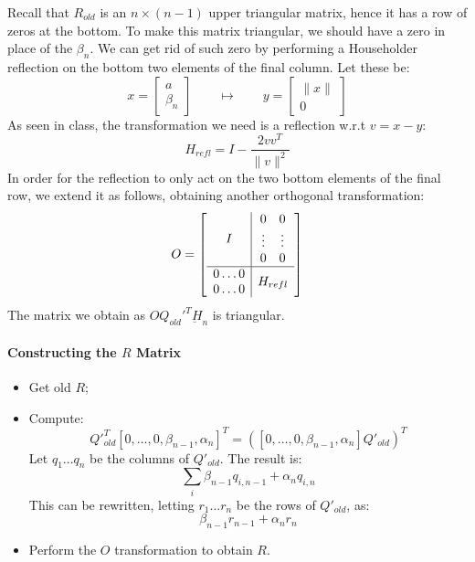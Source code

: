 \documentclass{article}
\begin{document}
Recall that $R_{old}$ is an $n \times (n-1)$ upper triangular matrix, hence it has a row of zeros at the bottom. To make this matrix triangular, we should have a zero in place of the $\beta_n$. We can get rid of such zero by performing a Householder reflection on the bottom two elements of the final column. Let these be:
\[x = \begin{bmatrix}
       a \\ \beta_n
      \end{bmatrix}
\quad\quad \mapsto \quad\quad y = \begin{bmatrix}
       \|x\| \\ 0
      \end{bmatrix}\] 
  As seen in class, the transformation we need is a reflection w.r.t $v = x - y$:
  \[H_{refl} = I - \dfrac{2 vv^T}{\|v\|^2}\]
  In order for the reflection to only act on the two bottom elements of the final row, we extend it as follows, obtaining another orthogonal transformation:
  \[O = \left[\begin{array}{ c | c }
    I & \begin{matrix}
         0&0\\
         \vdots &\vdots \\
         0&0
        \end{matrix}

 \\
    \hline
    \begin{matrix}
         0 \hdots 0\\0 \hdots 0
        \end{matrix} & H_{refl}
  \end{array}\right]\]
  The matrix we obtain as $OQ_{old}'^T\underbar H_n$ is triangular.
  
  \paragraph{Constructing the $R$ Matrix}
  \begin{itemize}
   \item Get old $R$;
   \item Compute:
   \[Q'^T_{old}[
            0,
            \hdots,
            0,
            \beta_{n-1},
            \alpha_n]^T= ([
            0,
            \hdots,
            0,
            \beta_{n-1},
            \alpha_n]Q'_{old})^T\]
  Let $q_1 ... q_n$ be the columns of $Q'_{old}$. The result is:
  \[\sum_i \beta_{n-1} q_{i, n-1} + \alpha_{n} q_{i, n}\]
  This can be rewritten, letting $r_1...r_n$ be the rows of $Q'_{old}$, as:
  \[\beta_{n-1}r_{n-1} + \alpha_n r_{n}\]
  \item Perform the $O$ transformation to obtain $R$.
  \end{itemize}
\end{document}
